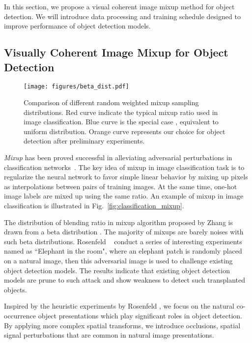 \documentclass[10pt,twocolumn,letterpaper]{article}
\begin{document}
\label{sec:details}
In this section, we propose a visual coherent image mixup method for object detection. We will introduce data processing and training schedule designed to improve performance of object detection models. 



\subsection{Visually Coherent Image Mixup for Object Detection}

\begin{figure}[t!]
  \centering
    \texttt{[image: figures/beta\_dist.pdf]}
  \caption{Comparison of different random weighted mixup sampling distributions. Red curve  indicate the typical mixup ratio used in image classification. Blue curve is the special case , equivalent to uniform distribution. Orange curve represents our choice  for object detection after preliminary experiments. }
  \label{fig:beta_dist}
\end{figure}

\textit{Mixup} has been proved successful in alleviating adversarial perturbations in classification networks~\cite{zhang2017mixup}. The key idea of mixup in image classification task is to regularize the neural network to favor simple linear behavior by mixing up pixels as interpolations between pairs of training images. At the same time, one-hot image labels are mixed up using the same ratio. An example of mixup in image classification is illustrated in Fig.~\ref{fig:classification_mixup}. 

The distribution of blending ratio in mixup algorithm proposed by Zhang \etal \cite{zhang2017mixup} is drawn from a beta distribution . 
The majority of mixups are barely noises with such beta distributions. Rosenfeld \etal~\cite{rosenfeld2018elephant} conduct a series of interesting experiments named as ``Elephant in the room", where an elephant patch is randomly placed on a natural image, then this adversarial image is used to challenge existing object detection models. The results indicate that existing object detection models are prune to such attack and show weakness to detect such transplanted objects.

Inspired by the heuristic experiments by Rosenfeld \etal \cite{rosenfeld2018elephant}, we focus on the natural co-occurrence object presentations which play significant roles in object detection. By applying more complex spatial transforms, we introduce occlusions, spatial signal perturbations that are common in natural image presentations. 
\end{document}
